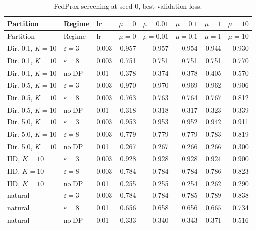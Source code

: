 {\scriptsize
\begin{longtable}{lllrrrrr}
\caption{FedProx screening at seed 0, best validation loss.}\label{tab:s_fedprox}\\
\toprule
Partition & Regime & lr & $\mu=0$ & $\mu=0.01$ & $\mu=0.1$ & $\mu=1$ & $\mu=10$ \\
\midrule
\endfirsthead
\toprule
Partition & Regime & lr & $\mu=0$ & $\mu=0.01$ & $\mu=0.1$ & $\mu=1$ & $\mu=10$ \\
\midrule
\endhead
\bottomrule
\endlastfoot
Dir. 0.1, $K{=}10$ & $\varepsilon=3$ & 0.003 & 0.957 & 0.957 & 0.954 & 0.944 & 0.930 \\
Dir. 0.1, $K{=}10$ & $\varepsilon=8$ & 0.003 & 0.751 & 0.751 & 0.751 & 0.751 & 0.770 \\
Dir. 0.1, $K{=}10$ & no DP & 0.01 & 0.378 & 0.374 & 0.378 & 0.405 & 0.570 \\
Dir. 0.5, $K{=}10$ & $\varepsilon=3$ & 0.003 & 0.970 & 0.970 & 0.969 & 0.962 & 0.906 \\
Dir. 0.5, $K{=}10$ & $\varepsilon=8$ & 0.003 & 0.763 & 0.763 & 0.764 & 0.767 & 0.812 \\
Dir. 0.5, $K{=}10$ & no DP & 0.01 & 0.318 & 0.318 & 0.317 & 0.323 & 0.339 \\
Dir. 5.0, $K{=}10$ & $\varepsilon=3$ & 0.003 & 0.953 & 0.953 & 0.952 & 0.942 & 0.911 \\
Dir. 5.0, $K{=}10$ & $\varepsilon=8$ & 0.003 & 0.779 & 0.779 & 0.779 & 0.783 & 0.819 \\
Dir. 5.0, $K{=}10$ & no DP & 0.01 & 0.267 & 0.267 & 0.266 & 0.266 & 0.300 \\
IID, $K{=}10$ & $\varepsilon=3$ & 0.003 & 0.928 & 0.928 & 0.928 & 0.924 & 0.900 \\
IID, $K{=}10$ & $\varepsilon=8$ & 0.003 & 0.784 & 0.784 & 0.784 & 0.786 & 0.823 \\
IID, $K{=}10$ & no DP & 0.01 & 0.255 & 0.255 & 0.254 & 0.262 & 0.290 \\
natural & $\varepsilon=3$ & 0.003 & 0.784 & 0.784 & 0.785 & 0.789 & 0.838 \\
natural & $\varepsilon=8$ & 0.01 & 0.656 & 0.658 & 0.656 & 0.665 & 0.734 \\
natural & no DP & 0.01 & 0.333 & 0.340 & 0.343 & 0.371 & 0.516 \\
\end{longtable}}

